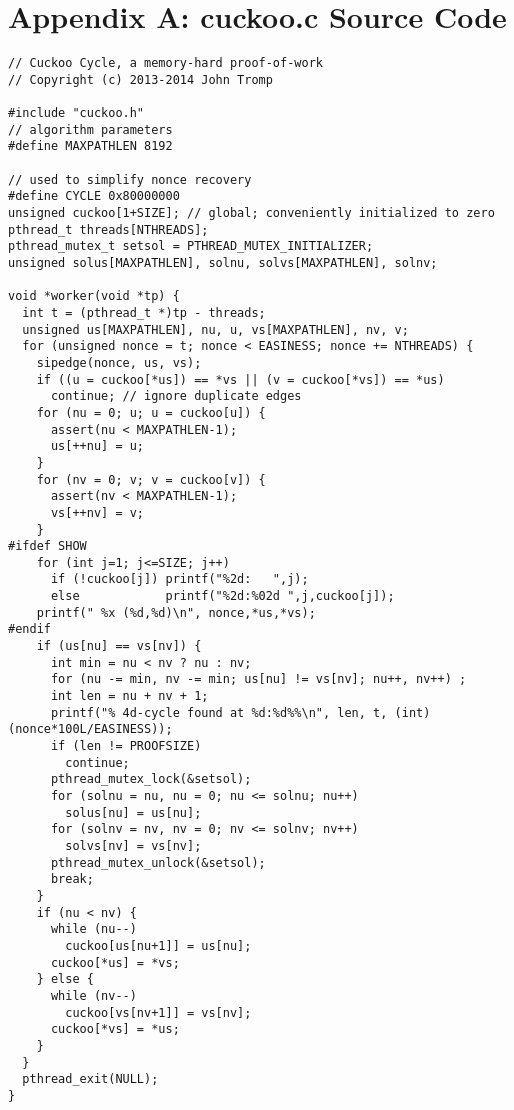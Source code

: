 \documentclass[11pt, oneside]{article}
\begin{document}
\section{Appendix A: cuckoo.c Source Code}
\footnotesize
\begin{verbatim}
// Cuckoo Cycle, a memory-hard proof-of-work
// Copyright (c) 2013-2014 John Tromp

#include "cuckoo.h"
// algorithm parameters
#define MAXPATHLEN 8192

// used to simplify nonce recovery
#define CYCLE 0x80000000
unsigned cuckoo[1+SIZE]; // global; conveniently initialized to zero
pthread_t threads[NTHREADS];
pthread_mutex_t setsol = PTHREAD_MUTEX_INITIALIZER;
unsigned solus[MAXPATHLEN], solnu, solvs[MAXPATHLEN], solnv; 

void *worker(void *tp) {
  int t = (pthread_t *)tp - threads;
  unsigned us[MAXPATHLEN], nu, u, vs[MAXPATHLEN], nv, v; 
  for (unsigned nonce = t; nonce < EASINESS; nonce += NTHREADS) {
    sipedge(nonce, us, vs);
    if ((u = cuckoo[*us]) == *vs || (v = cuckoo[*vs]) == *us)
      continue; // ignore duplicate edges
    for (nu = 0; u; u = cuckoo[u]) {
      assert(nu < MAXPATHLEN-1);
      us[++nu] = u;
    }
    for (nv = 0; v; v = cuckoo[v]) {
      assert(nv < MAXPATHLEN-1);
      vs[++nv] = v;
    }
#ifdef SHOW
    for (int j=1; j<=SIZE; j++)
      if (!cuckoo[j]) printf("%2d:   ",j);
      else            printf("%2d:%02d ",j,cuckoo[j]);
    printf(" %x (%d,%d)\n", nonce,*us,*vs);
#endif
    if (us[nu] == vs[nv]) {
      int min = nu < nv ? nu : nv;
      for (nu -= min, nv -= min; us[nu] != vs[nv]; nu++, nv++) ;
      int len = nu + nv + 1;
      printf("% 4d-cycle found at %d:%d%%\n", len, t, (int)(nonce*100L/EASINESS));
      if (len != PROOFSIZE)
        continue;
      pthread_mutex_lock(&setsol);
      for (solnu = nu, nu = 0; nu <= solnu; nu++)
        solus[nu] = us[nu];
      for (solnv = nv, nv = 0; nv <= solnv; nv++)
        solvs[nv] = vs[nv];
      pthread_mutex_unlock(&setsol);
      break;
    }
    if (nu < nv) {
      while (nu--)
        cuckoo[us[nu+1]] = us[nu];
      cuckoo[*us] = *vs;
    } else {
      while (nv--)
        cuckoo[vs[nv+1]] = vs[nv];
      cuckoo[*vs] = *us;
    }
  }
  pthread_exit(NULL);
}


\end{verbatim}
\end{document}
